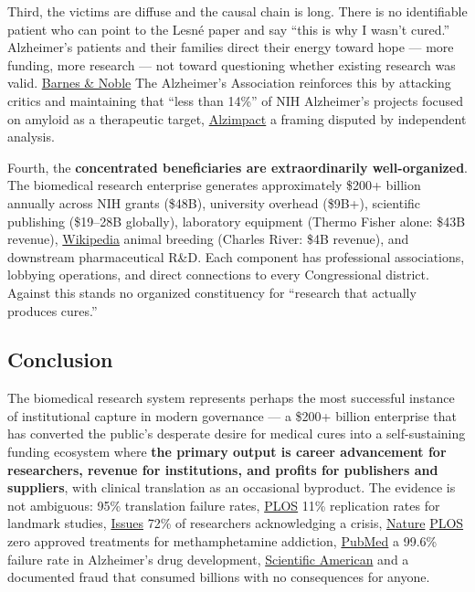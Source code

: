 Third, the victims are diffuse and the causal chain is long. There is no identifiable patient who can point to the Lesné paper and say ``this is why I wasn't cured.'' Alzheimer's patients and their families direct their energy toward hope --- more funding, more research --- not toward questioning whether existing research was valid. \href{https://www.barnesandnoble.com/w/doctored-charles-piller/1145681914}{Barnes \& Noble} The Alzheimer's Association reinforces this by attacking critics and maintaining that ``less than 14\%'' of NIH Alzheimer's projects focused on amyloid as a therapeutic target, \href{https://alzimpact.org/Contrary-to-Clear-Verifiable-Facts-Secretary-Kennedy-Continues-to-Repeat-Harmful-Myths}{Alzimpact} a framing disputed by independent analysis.

Fourth, the \textbf{concentrated beneficiaries are extraordinarily well-organized}. The biomedical research enterprise generates approximately \$200+ billion annually across NIH grants (\$48B), university overhead (\$9B+), scientific publishing (\$19--28B globally), laboratory equipment (Thermo Fisher alone: \$43B revenue), \href{https://en.wikipedia.org/wiki/Thermo_Fisher_Scientific}{Wikipedia} animal breeding (Charles River: \$4B revenue), and downstream pharmaceutical R\&D. Each component has professional associations, lobbying operations, and direct connections to every Congressional district. Against this stands no organized constituency for ``research that actually produces cures.''

\subsection{Conclusion}\label{19_200_billion-conclusion}

The biomedical research system represents perhaps the most successful instance of institutional capture in modern governance --- a \$200+ billion enterprise that has converted the public's desperate desire for medical cures into a self-sustaining funding ecosystem where \textbf{the primary output is career advancement for researchers, revenue for institutions, and profits for publishers and suppliers}, with clinical translation as an occasional byproduct. The evidence is not ambiguous: 95\% translation failure rates, \href{https://journals.plos.org/plosbiology/article?id=10.1371/journal.pbio.3002667}{PLOS} 11\% replication rates for landmark studies, \href{https://issues.org/ending-reproducibility-crisis-medical-research-brownlee-bielekova/}{Issues} 72\% of researchers acknowledging a crisis, \href{https://www.nature.com/articles/d41586-024-04253-w}{Nature} \href{https://journals.plos.org/plosbiology/article?id=10.1371/journal.pbio.3002870}{PLOS} zero approved treatments for methamphetamine addiction, \href{https://pubmed.ncbi.nlm.nih.gov/34344291/}{PubMed} a 99.6\% failure rate in Alzheimer's drug development, \href{https://www.scientificamerican.com/article/why-alzheimer-s-drugs-keep-failing/}{Scientific American} and a documented fraud that consumed billions with no consequences for anyone.

